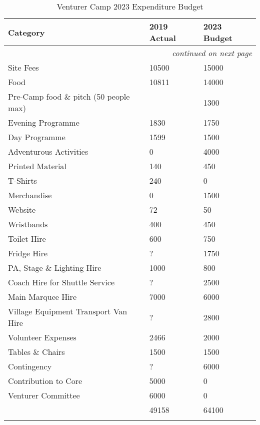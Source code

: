 {\RaggedRight \centering
    \begin{longtable}{p{} p{} p{}}
    \textbf{Category} & \textbf{2019 Actual} & \textbf{2023 Budget}\\
    \hline
    \hline
    \endhead

    \multicolumn{3}{r}{\footnotesize\itshape continued on next page}\\
    \endfoot 

    \endlastfoot

    Site Fees & 10500 & 15000\\
    \hline
    Food & 10811 & 14000\\
    \hline
    Pre-Camp food \& pitch (50 people max) & & 1300\\
    \hline
    Evening Programme & 1830 & 1750 \\
    \hline
    Day Programme & 1599 & 1500\\
    \hline
    Adventurous Activities & 0 & 4000\\
    \hline
    Printed Material & 140 & 450 \\
    \hline
    T-Shirts & 240 & 0\\
    \hline
    Merchandise & 0 & 1500\\
    \hline
    Website & 72 & 50 \\
    \hline
    Wristbands & 400 & 450 \\
    \hline
    Toilet Hire & 600 & 750\\
    \hline
    Fridge Hire & ? & 1750 \\
    \hline
    PA, Stage \& Lighting Hire & 1000 & 800\\
    \hline
    Coach Hire for Shuttle Service & ? & 2500\\
    \hline
    Main Marquee Hire & 7000 & 6000\\
    \hline
    Village Equipment Transport Van Hire & ? & 2800\\
    \hline
    Volunteer Expenses & 2466 & 2000\\
    \hline
    Tables \& Chairs & 1500 & 1500\\
    \hline
    Contingency & ? & 6000\\
    \hline
    Contribution to Core & 5000 & 0 \\
    \hline
    Venturer Committee & 6000 & 0\\
    \hline
    \rowcolor{accent!60}
    \multicolumn{1}{r}{\textit{Total Expenditure}} & 49158 & 64100\\
    \hline

    \caption{Venturer Camp 2023 Expenditure Budget}
    \end{longtable}
} %


